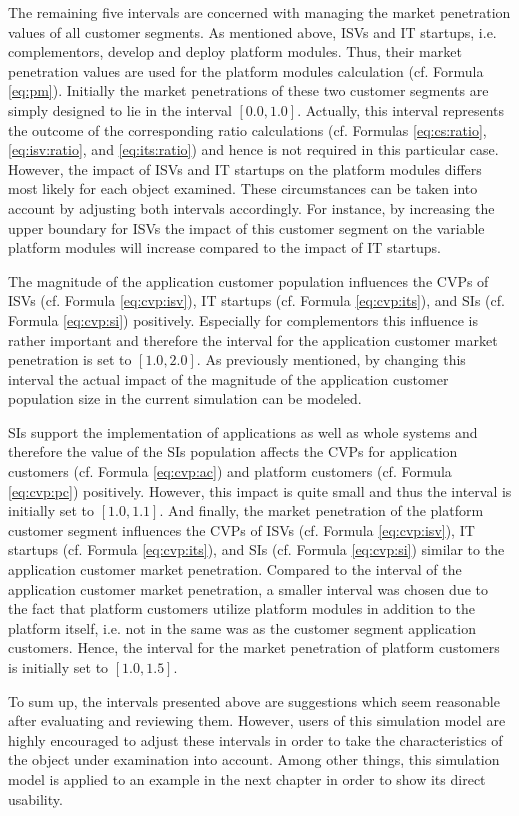 The remaining five intervals are concerned with managing the market penetration values of all customer segments. As mentioned above, \acp{ISV} and \ac{IT} startups, i.e. complementors, develop and deploy platform modules. Thus, their market penetration values are used for the platform modules calculation (cf. Formula \ref{eq:pm}). Initially the market penetrations of these two customer segments are simply designed to lie in the interval $[0.0,1.0]$. Actually, this interval represents the outcome of the corresponding ratio calculations (cf. Formulas \ref{eq:cs:ratio}, \ref{eq:isv:ratio}, and \ref{eq:its:ratio}) and hence is not required in this particular case. However, the impact of \acp{ISV} and \ac{IT} startups on the platform modules differs most likely for each object examined. These circumstances can be taken into account by adjusting both intervals accordingly. For instance, by increasing the upper boundary for \acp{ISV} the impact of this customer segment on the variable platform modules will increase compared to the impact of \ac{IT} startups.

The magnitude of the application customer population influences the \acp{CVP} of \acp{ISV} (cf. Formula \ref{eq:cvp:isv}), \ac{IT} startups (cf. Formula \ref{eq:cvp:its}), and \acp{SI} (cf. Formula \ref{eq:cvp:si}) positively. Especially for complementors this influence is rather important and therefore the interval for the application customer market penetration is set to $[1.0,2.0]$. As previously mentioned, by changing this interval the actual impact of the magnitude of the application customer population size in the current simulation can be modeled.

\acp{SI} support the implementation of applications as well as whole systems and therefore the value of the \acp{SI} population affects the \acp{CVP} for application customers (cf. Formula \ref{eq:cvp:ac}) and platform customers (cf. Formula \ref{eq:cvp:pc}) positively. However, this impact is quite small and thus the interval is initially set to $[1.0,1.1]$. And finally, the market penetration of the platform customer segment influences the \acp{CVP} of \acp{ISV} (cf. Formula \ref{eq:cvp:isv}), \ac{IT} startups (cf. Formula \ref{eq:cvp:its}), and \acp{SI} (cf. Formula \ref{eq:cvp:si}) similar to the application customer market penetration. Compared to the interval of the application customer market penetration, a smaller interval was chosen due to the fact that platform customers utilize platform modules in addition to the platform itself, i.e. not in the same was as the customer segment application customers. Hence, the interval for the market penetration of platform customers is initially set to $[1.0,1.5]$.

To sum up, the intervals presented above are suggestions which seem reasonable after evaluating and reviewing them. However, users of this simulation model are highly encouraged to adjust these intervals in order to take the characteristics of the object under examination into account. Among other things, this simulation model is applied to an example in the next chapter in order to show its direct usability.

